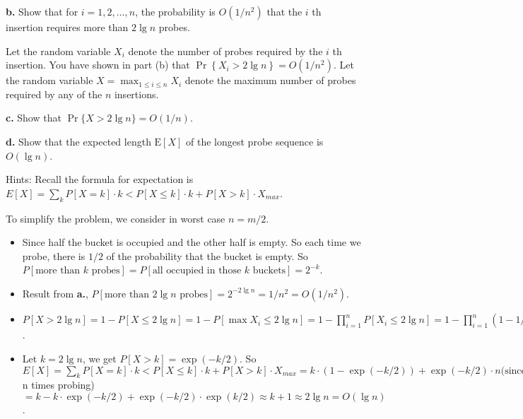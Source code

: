 \documentclass[11pt]{exam}
\begin{document}
\textbf{b.} Show that for $i=1,2, \ldots, n$, the probability is $O\left(1 / n^{2}\right)$ that the $i$ th insertion requires more than $2 \lg n$ probes.

Let the random variable $X_{i}$ denote the number of probes required by the $i$ th insertion. You have shown in part (b) that $\operatorname{Pr}\left\{X_{i}>2 \lg n\right\}=O\left(1 / n^{2}\right)$. Let the random variable $X=\max _{1 \leq i \leq n}
X_{i}$ denote the maximum number of probes required by any of the $n$ insertions.

\textbf{c.} Show that $\operatorname{Pr}\{X>2 \lg n\}=O(1 / n)$.

\textbf{d.} Show that the expected length $\mathrm{E}[X]$ of the longest probe sequence is $O(\lg n)$. \par 
Hints: Recall the formula for expectation is $E[X] = \sum_{k} P[X = k]\cdot k < P[X \leq k] \cdot k + P[X > k] \cdot X_{max}$. 

\begin{solution}
    To simplify the problem, we consider in worst case $n = m/2$.
    \begin{itemize}
        \item[a.] Since half the bucket is occupied and the other half is empty. So each time we probe, there is 
        $1/2$ of the probability that the bucket is empty. So $P[\text{more than }k \text{ probes}] = P[\text{all occupied in those }k\text{ buckets}] = 2^{-k}$. 
        \item[b.] Result from \textbf{a.}, $P[\text{more than }2\lg n\text{ probes}] = 2^{-2 \lg n} = 1 / n^2 = O(1/n^2)$.
        \item[c.] $P[X > 2 \lg n] = 1 - P[X \leq 2\lg n] = 1 - P [\max X_i \leq 2 \lg n] =
        1 - \prod_{i=1}^n P[X_i \leq  2\lg n] = 1 - \prod_{i=1}^n (1 - 1/n^2) = 1 - (1 - 1/n^2)^ n 
        \approx 1 - (1 - \frac{1}{n^2}\cdot n) = O(1/n)$.
        \item[d.] Let $k = 2\lg n$, we get $P[X>k] = \exp(-k / 2)$. So $E[X] = \sum_k P[X=k]\cdot k
         < P[X\leq k]\cdot k + P[X > k] \cdot X_{max} = k \cdot (1 - \exp(-k/2)) + \exp(-k/2) \cdot n \text{(since 
         we would at most do}$ n times probing) $ = k - k\cdot \exp(-k/2) + \exp (-k/2) \cdot \exp(k/2) \approx k +1 \approx 2 \lg n = O(\lg n)$.
    \end{itemize}
\end{solution}
\end{document}
